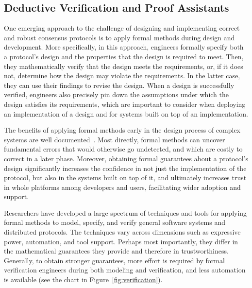 
\subsection{Deductive Verification and Proof Assistants}

One emerging approach to the challenge of designing and implementing correct and robust consensus protocols is to apply formal methods during design and development. More specifically, in this approach, engineers formally specify both a protocol's design and the properties that the design is required to meet. Then, they mathematically verify that the design meets the requirements, or, if it does not, determine how the design may violate the requirements. In the latter case, they can use their findings to revise the design. When a design is successfully verified, engineers also precisely pin down the assumptions under which the design satisfies its requirements, which are important to consider when deploying an implementation of a design and for systems built on top of an implementation.

The benefits of applying formal methods early in the design process of complex systems are well documented~\cite{Yang2011,Fonseca2017}. Most directly, formal methods can uncover fundamental errors that would otherwise go undetected, and which are costly to correct in a later phase. Moreover, obtaining formal guarantees about a protocol's design significantly increases the confidence in not just the implementation of the protocol, but also in the systems built on top of it, and ultimately increases trust in whole platforms among developers and users, facilitating wider adoption and support.

Researchers have developed a large spectrum of techniques and tools for applying formal methods to model, specify, and verify general software systems and distributed protocols. The techniques vary across dimensions such as expressive power, automation, and tool support. Perhaps most importantly, they differ in the mathematical guarantees they provide and therefore in trustworthiness. Generally, to obtain stronger guarantees, more effort is required by formal verification engineers during both modeling and verification, and less automation is available (see the chart in Figure~\ref{fig:verification}).

